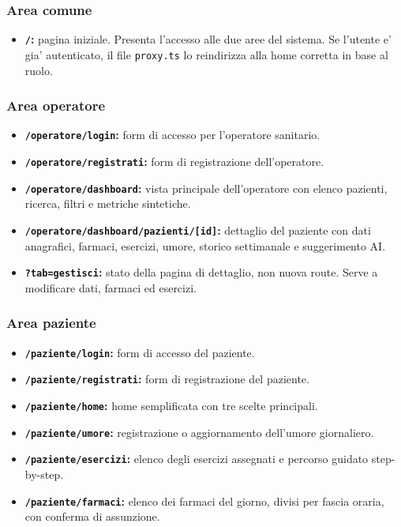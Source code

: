 \subsubsection{Area comune}
\begin{itemize}
    \item \textbf{\texttt{/}:} pagina iniziale. Presenta l'accesso alle due aree del sistema. Se l'utente e' gia' autenticato, il file \texttt{proxy.ts} lo reindirizza alla home corretta in base al ruolo.
\end{itemize}

\subsubsection{Area operatore}
\begin{itemize}
    \item \textbf{\texttt{/operatore/login}:} form di accesso per l'operatore sanitario.
    \item \textbf{\texttt{/operatore/registrati}:} form di registrazione dell'operatore.
    \item \textbf{\texttt{/operatore/dashboard}:} vista principale dell'operatore con elenco pazienti, ricerca, filtri e metriche sintetiche.
    \item \textbf{\texttt{/operatore/dashboard/pazienti/[id]}:} dettaglio del paziente con dati anagrafici, farmaci, esercizi, umore, storico settimanale e suggerimento AI.
    \item \textbf{\texttt{?tab=gestisci}:} stato della pagina di dettaglio, non nuova route. Serve a modificare dati, farmaci ed esercizi.
\end{itemize}

\subsubsection{Area paziente}
\begin{itemize}
    \item \textbf{\texttt{/paziente/login}:} form di accesso del paziente.
    \item \textbf{\texttt{/paziente/registrati}:} form di registrazione del paziente.
    \item \textbf{\texttt{/paziente/home}:} home semplificata con tre scelte principali.
    \item \textbf{\texttt{/paziente/umore}:} registrazione o aggiornamento dell'umore giornaliero.
    \item \textbf{\texttt{/paziente/esercizi}:} elenco degli esercizi assegnati e percorso guidato step-by-step.
    \item \textbf{\texttt{/paziente/farmaci}:} elenco dei farmaci del giorno, divisi per fascia oraria, con conferma di assunzione.
\end{itemize}

